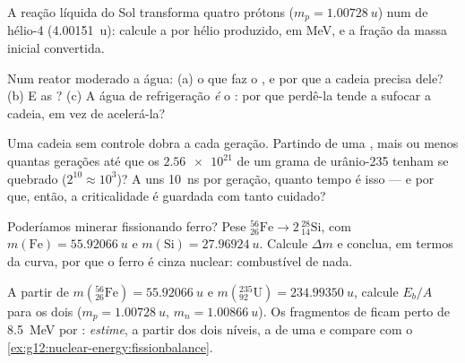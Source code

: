 \begin{exercise}[$\star\star$]\label{exo:g12:nuclear-energy:10}
A reação líquida do Sol transforma quatro prótons ($m_p = \qty{1.00728}{u}$) num 
de hélio-4 (\qty{4.00151}{u}): calcule a  por hélio produzido, em \unit{MeV}, e a
fração da massa inicial convertida.
\end{exercise}

\begin{exercise}[$\star\star$]\label{exo:g12:nuclear-energy:11}
Num reator moderado a água: (a) o que faz o , e por que a cadeia precisa dele?
(b) E as ? (c) A água de refrigeração \emph{é} o : por que
perdê-la tende a sufocar a cadeia, em vez de acelerá-la?
\end{exercise}

\begin{exercise}[$\star\star\star$]\label{exo:g12:nuclear-energy:12}
Uma cadeia sem controle dobra a cada geração. Partindo de uma , mais ou menos
quantas gerações até que os $\num{2.56e21}$  de um grama de urânio-235 tenham se
quebrado ($2^{10} \approx 10^{3}$)? A uns \qty{10}{ns} por geração, quanto tempo é isso
--- e por que, então, a criticalidade é guardada com tanto cuidado?
\end{exercise}

\begin{exercise}[$\star\star\star$]\label{exo:g12:nuclear-energy:13}
Poderíamos minerar  fissionando ferro? Pese
${}^{56}_{26}\mathrm{Fe} \to 2\,{}^{28}_{14}\mathrm{Si}$, com
$m(\mathrm{Fe}) = \qty{55.92066}{u}$ e $m(\mathrm{Si}) = \qty{27.96924}{u}$. Calcule
$\Delta m$ e conclua, em termos da curva, por que o ferro é cinza nuclear: combustível
de nada.
\end{exercise}

\begin{exercise}[$\star\star\star$]\label{exo:g12:nuclear-energy:14}
A partir de $m({}^{56}_{26}\mathrm{Fe}) = \qty{55.92066}{u}$ e
$m({}^{235}_{92}\mathrm{U}) = \qty{234.99350}{u}$, calcule $E_b/A$ para os dois
($m_p = \qty{1.00728}{u}$, $m_n = \qty{1.00866}{u}$). Os fragmentos de  ficam perto
de \qty{8.5}{MeV} por : \emph{estime}, a partir dos dois níveis, a  de uma
 e compare com o \cref{ex:g12:nuclear-energy:fissionbalance}.
\end{exercise}

